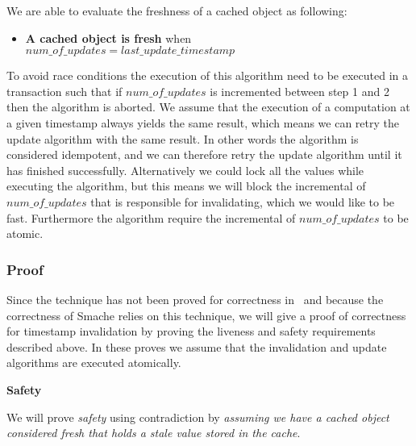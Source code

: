 We are able to evaluate the freshness of a cached object as following:

\begin{itemize}
  \item \textbf{A cached object is fresh} when\\$num\_of\_updates = last\_update\_timestamp$
\end{itemize}

To avoid race conditions the execution of this algorithm need to be executed in a transaction such that if $num\_of\_updates$ is incremented between step 1 and 2 then the algorithm is aborted. We assume that the execution of a computation at a given timestamp always yields the same result, which means we can retry the update algorithm with the same result. In other words the algorithm is considered idempotent, and we can therefore retry the update algorithm until it has finished successfully. Alternatively we could lock all the values while executing the algorithm, but this means we will block the incremental of $num\_of\_updates$ that is responsible for invalidating, which we would like to be fast.
Furthermore the algorithm require the incremental of $num\_of\_updates$ to be atomic.

\subsubsection{Proof}
\label{subsubsec:proof}

Since the technique has not been proved for correctness in~\cite{paper:ibm-extended} and because the correctness of Smache relies on this technique, we will give a proof of correctness for timestamp invalidation by proving the liveness and safety requirements described above. In these proves we assume that the invalidation and update algorithms are executed atomically.

\textbf{Safety}

We will prove \emph{safety} using contradiction by \emph{assuming we have a cached object considered fresh that holds a stale value stored in the cache}.

